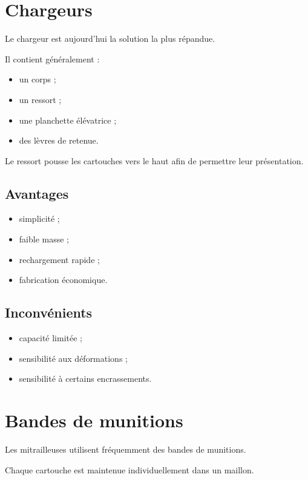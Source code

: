 \section{Chargeurs}

Le chargeur est aujourd'hui la solution la plus répandue.

Il contient généralement :

\begin{itemize}
    \item un corps ;
    \item un ressort ;
    \item une planchette élévatrice ;
    \item des lèvres de retenue.
\end{itemize}

Le ressort pousse les cartouches vers le haut afin de permettre leur
présentation.

\subsection{Avantages}

\begin{itemize}
    \item simplicité ;
    \item faible masse ;
    \item rechargement rapide ;
    \item fabrication économique.
\end{itemize}

\subsection{Inconvénients}

\begin{itemize}
    \item capacité limitée ;
    \item sensibilité aux déformations ;
    \item sensibilité à certains encrassements.
\end{itemize}

\section{Bandes de munitions}

Les mitrailleuses utilisent fréquemment des bandes de munitions.

Chaque cartouche est maintenue individuellement dans un maillon.

